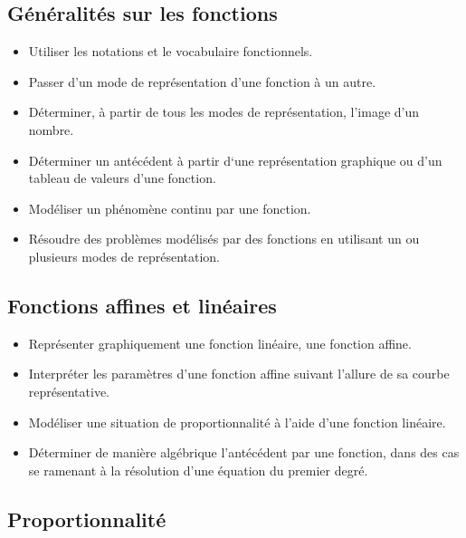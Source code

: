 \documentclass[a4paper,12pt,fleqn]{article}	
\begin{document}
\renewcommand{\labelitemi}{}

\subsection*{Généralités sur les fonctions}

\begin{itemize}
	\item {}Utiliser les notations et le vocabulaire fonctionnels.
	\item {}Passer d’un mode de représentation d’une fonction à un autre.
	\item {}Déterminer, à partir de tous les modes de représentation, l’image d’un nombre.
	\item {}Déterminer un antécédent à partir d‘une représentation graphique ou d’un tableau de valeurs d’une fonction.
	\item {}Modéliser un phénomène continu par une fonction.
	\item {}Résoudre des problèmes modélisés par des fonctions en utilisant un ou plusieurs modes de représentation.
\end{itemize}

\subsection*{Fonctions affines et linéaires}

\begin{itemize}
	\item {}Représenter graphiquement une fonction linéaire, une fonction affine.
	\item {}Interpréter les paramètres d’une fonction affine suivant l’allure de sa courbe représentative.
	\item {}Modéliser une situation de proportionnalité à l’aide d’une fonction linéaire.
	\item {}Déterminer de manière algébrique l’antécédent par une fonction, dans des cas se ramenant à la résolution d’une équation du premier degré.
\end{itemize}

\subsection*{Proportionnalité}
\end{document}
